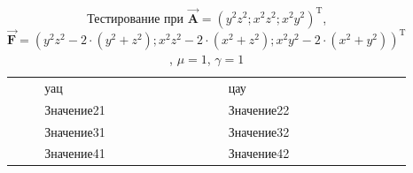 \begin{table}
	\caption{Тестирование при $\overrightarrow{\textbf{A}} = (y^2z^2; x^2z^2; x^2y^2)^{\text{T}}$, $\overrightarrow{\textbf{F}} = (y^2z^2 - 2\cdot(y^2+z^2); x^2z^2 - 2\cdot(x^2+z^2); x^2y^2 - 2\cdot(x^2+y^2))^{\text{T}}$, $\mu = 1$, $\gamma = 1$}
	\centering
	\small
	\begin{tabularx}{1.0\textwidth}{| >{\raggedright\arraybackslash}X | >{\raggedright\arraybackslash}X | >{\raggedright\arraybackslash}X |}
			\hline
			\centering{Точка} & \centering{Относиельная погрешность} & \centering{Дельты} \\ \hline
			\multirow{4}{*}{Координаты} & уац & цау \\ \cline{2-3}  
			& Значение21 & Значение22 \\ \cline{2-3}  
			& Значение31 & Значение32 \\ \cline{2-3}  
			& Значение41 & Значение42 \\ \hline
		\end{tabularx}
	\label{tab:test9}
\end{table}


